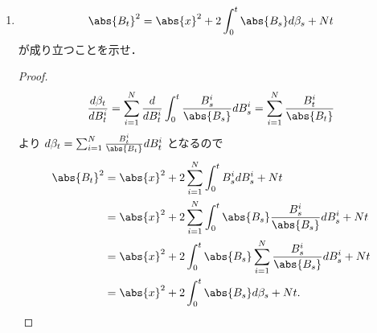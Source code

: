 \documentclass{jsarticle}
\begin{document}
\begin{enumerate}
\begin{proof}
        したがって $\beta$ は $(\clf_t)$-CLMである\nazo．
        ここで
        \begin{align}
            \gen{\beta, \beta}_t
            &= \gen{\sum_{i=1}^{N}\int_{0}^{\cdot}\frac{B_{s}^{i}}{\abs{B_s}}dB_s^i, \sum_{i=1}^{N}\int_{0}^{\cdot}\frac{B_{s}^{i}}{\abs{B_s}}dB_s^i}_t \\
            &= \sum_{i=1}^{N}\gen{\int_{0}^{\cdot}\frac{B_{s}^{i}}{\abs{B_s}}dB_s^i, \int_{0}^{\cdot}\frac{B_{s}^{i}}{\abs{B_s}}dB_s^i}_t \\
            &= \int_{0}^{t}\frac{\sum_{i=1}^{N}(B_{s}^{i})^2}{\abs{B_s}^2}ds
            = \int_{0}^{t}\frac{\abs{B_s}^2}{\abs{B_s}^2}ds = t
        \end{align}
        が成り立つことより，$\beta$ は0スタートの $(\clf_t)$-BMである．
    \end{proof}
    
    \item
    $$
    \abs{B_t}^2
    = \abs{x}^2+2\int_0^t \abs{B_s}d\beta_s+Nt
    $$
    が成り立つことを示せ．
    \begin{proof}
        \begin{align}
            \frac{d\beta_t}{dB_t^i}
            = \sum_{i=1}^{N}\frac{d}{dB_t^i}\int_0^t\frac{B_{s}^{i}}{\abs{B_s}}dB_s^i
            = \sum_{i=1}^{N}\frac{B_{t}^{i}}{\abs{B_t}}
        \end{align}
        より $d\beta_t=\sum_{i=1}^{N}\frac{B_{t}^{i}}{\abs{B_t}}dB_t^i$ となるので
        \begin{align}
            \abs{B_t}^2
            &= \abs{x}^2
            + 2\sum_{i=1}^{N}\int_{0}^{t}B_s^i dB_s^i
            + Nt \\
            &= \abs{x}^2
            + 2\sum_{i=1}^{N}\int_{0}^{t}\abs{B_s}\frac{B_{s}^{i}}{\abs{B_s}}dB_s^i
            + Nt \\
            &= \abs{x}^2
            + 2\int_{0}^{t}\abs{B_s}\sum_{i=1}^{N}\frac{B_{s}^{i}}{\abs{B_s}}dB_s^i
            + Nt \\
            &= \abs{x}^2
            + 2\int_{0}^{t}\abs{B_s}d\beta_s
            + Nt.
        \end{align}
    \end{proof}
    

\end{enumerate}
\end{document}
